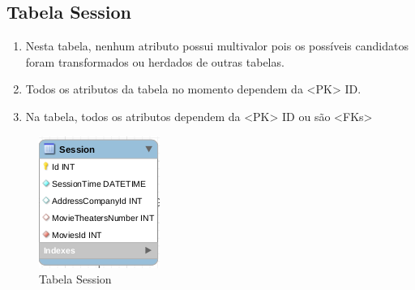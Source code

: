 \documentclass[a4paper,10pt]{article}
\begin{document}

\subsection{Tabela Session}

\begin{enumerate}
	\item Nesta tabela, nenhum atributo possui multivalor pois os possíveis candidatos foram transformados ou herdados de outras tabelas.
	\item Todos os atributos da tabela no momento dependem da <PK> ID.
	\item Na tabela, todos os atributos dependem da <PK> ID ou são <FKs>
\end{enumerate}
			
\begin{figure}%
\includegraphics[width=.4\columnwidth]{normalizacao/session}%
\caption{Tabela Session}%
\end{figure}


%
% 
\end{document}
